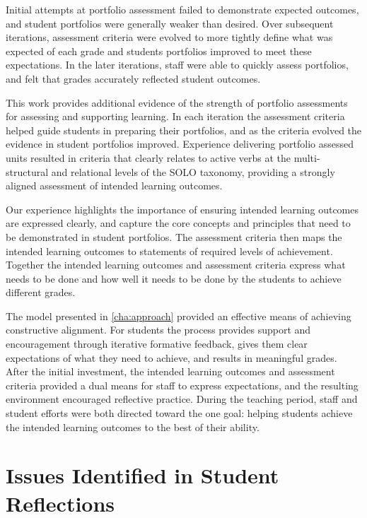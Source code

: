 Initial attempts at portfolio assessment failed to demonstrate expected outcomes, and student portfolios were generally weaker than desired. Over subsequent iterations, assessment criteria were evolved to more tightly define what was expected of each grade and students portfolios improved to meet these expectations. In the later iterations, staff were able to quickly assess portfolios, and felt that grades accurately reflected student outcomes.

This work provides additional evidence of the strength of portfolio assessments for assessing and supporting learning. In each iteration the assessment criteria helped guide students in preparing their portfolios, and as the criteria evolved the evidence in student portfolios improved. Experience delivering portfolio assessed units resulted in criteria that clearly relates to active verbs at the multi-structural and relational levels of the SOLO taxonomy, providing a strongly aligned assessment of intended learning outcomes.

Our experience highlights the importance of ensuring intended learning outcomes are expressed clearly, and capture the core concepts and principles that need to be demonstrated in student portfolios. The assessment criteria then maps the intended learning outcomes to statements of required levels of achievement. Together the intended learning outcomes and assessment criteria express what needs to be done and how well it needs to be done by the students to achieve different grades.

The model presented in \cref{cha:approach} provided an effective means of achieving constructive alignment. For students the process provides support and encouragement through iterative formative feedback, gives them clear expectations of what they need to achieve, and results in meaningful grades. After the initial investment, the intended learning outcomes and assessment criteria provided a dual means for staff to express expectations, and the resulting environment encouraged reflective practice. During the teaching period, staff and student efforts were both directed toward the one goal: helping students achieve the intended learning outcomes to the best of their ability.


\clearpage
\section{Issues Identified in Student Reflections} %
\label{sec:issues_identified_in_student_reflections}

